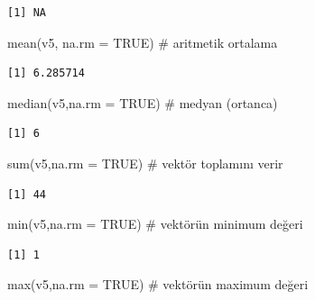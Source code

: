 \documentclass[
  letterpaper,
  DIV=11,
  numbers=noendperiod]{scrreprt}
\newenvironment{Shaded}{\begin{snugshade}}{\end{snugshade}}
\newcommand{\AttributeTok}[1]{\textcolor[rgb]{0.40,0.45,0.13}{#1}}
\newcommand{\CommentTok}[1]{\textcolor[rgb]{0.37,0.37,0.37}{#1}}
\newcommand{\ConstantTok}[1]{\textcolor[rgb]{0.56,0.35,0.01}{#1}}
\newcommand{\FunctionTok}[1]{\textcolor[rgb]{0.28,0.35,0.67}{#1}}
\newcommand{\NormalTok}[1]{\textcolor[rgb]{0.00,0.23,0.31}{#1}}
\begin{document}
\begin{verbatim}
[1] NA
\end{verbatim}

\begin{Shaded}
\begin{Highlighting}[]
\FunctionTok{mean}\NormalTok{(v5, }\AttributeTok{na.rm =} \ConstantTok{TRUE}\NormalTok{) }\CommentTok{\# aritmetik ortalama}
\end{Highlighting}
\end{Shaded}

\begin{verbatim}
[1] 6.285714
\end{verbatim}

\begin{Shaded}
\begin{Highlighting}[]
\FunctionTok{median}\NormalTok{(v5,}\AttributeTok{na.rm =} \ConstantTok{TRUE}\NormalTok{) }\CommentTok{\# medyan (ortanca)}
\end{Highlighting}
\end{Shaded}

\begin{verbatim}
[1] 6
\end{verbatim}

\begin{Shaded}
\begin{Highlighting}[]
\FunctionTok{sum}\NormalTok{(v5,}\AttributeTok{na.rm =} \ConstantTok{TRUE}\NormalTok{) }\CommentTok{\# vektör toplamını verir}
\end{Highlighting}
\end{Shaded}

\begin{verbatim}
[1] 44
\end{verbatim}

\begin{Shaded}
\begin{Highlighting}[]
\FunctionTok{min}\NormalTok{(v5,}\AttributeTok{na.rm =} \ConstantTok{TRUE}\NormalTok{) }\CommentTok{\# vektörün minimum değeri}
\end{Highlighting}
\end{Shaded}

\begin{verbatim}
[1] 1
\end{verbatim}

\begin{Shaded}
\begin{Highlighting}[]
\FunctionTok{max}\NormalTok{(v5,}\AttributeTok{na.rm =} \ConstantTok{TRUE}\NormalTok{) }\CommentTok{\# vektörün maximum değeri}
\end{Highlighting}
\end{Shaded}
\end{document}
